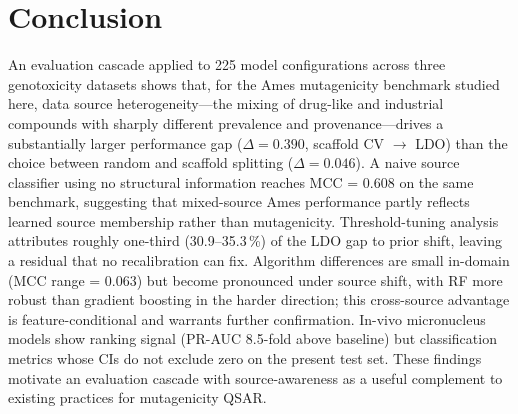 \section{Conclusion}

An evaluation cascade applied to 225 model configurations across three genotoxicity datasets 
shows that, for the Ames mutagenicity benchmark studied here, data source 
heterogeneity---the mixing of drug-like and industrial compounds with sharply different 
prevalence and provenance---drives a substantially larger performance gap ($\Delta = 0.390$, 
scaffold CV $\to$ LDO) than the choice between random and scaffold splitting 
($\Delta = 0.046$). A naive source classifier using no structural information reaches MCC = 
0.608 on the same benchmark, suggesting that mixed-source Ames performance partly reflects 
learned source membership rather than mutagenicity. Threshold-tuning analysis attributes roughly one-third (30.9--35.3\,\%) of the LDO gap to 
prior shift, leaving a residual that no recalibration can fix. 
Algorithm differences are small in-domain (MCC range = 0.063) but become pronounced under 
source shift, with RF more robust than gradient boosting in the harder direction; this 
cross-source advantage is feature-conditional and warrants further confirmation. In-vivo 
micronucleus models show ranking signal (PR-AUC 8.5-fold above baseline) but classification 
metrics whose CIs do not exclude zero on the present test set. These findings motivate an 
evaluation cascade with source-awareness as a useful complement to existing practices for 
mutagenicity QSAR.
